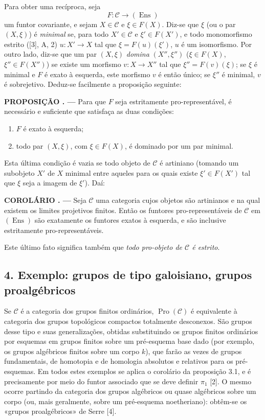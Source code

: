 \documentclass[11pt,twoside,openany]{book}
\numberwithin{equation}{section}
\newcommand{\src}[1]{%
  \phantomsection\hypertarget{src:#1}{}%
  \marginpar{\raggedleft\footnotesize\sffamily #1}%
}
\theoremstyle{plain}
\theoremstyle{definition}
\theoremstyle{remark}
\newcommand{\result}[2]{%
  \par\medskip\noindent\textbf{#1%
  \if\relax\detokenize{#2}\relax\else\space#2\fi. ---}\enspace
}
\newcommand{\FgaUnitKey}{frontmatter}
\renewcommand{\src}[1]{%
  \phantomsection\hypertarget{src:\FgaUnitKey:#1}{}%
  \marginpar{\raggedleft\footnotesize\sffamily #1}%
}
\begin{document}
Para obter uma recíproca, seja
\[
  F:\mathcal C\longrightarrow(\operatorname{Ens})
\]
um funtor covariante, e sejam $X\in\mathcal C$ e $\xi\in F(X)$. Diz-se que
$\xi$ (ou o par \src{374}$(X,\xi)$) é \emph{minimal} se, para todo
$X'\in\mathcal C$ e $\xi'\in F(X')$, e todo monomorfismo estrito ([3], A, 2)
$u:X'\longrightarrow X$ tal que $\xi=F(u)(\xi')$, $u$ é um isomorfismo. Por
outro lado, diz-se que um par $(X,\xi)$ \emph{domina} $(X'',\xi'')$
($\xi\in F(X)$, $\xi''\in F(X'')$) se existe um morfismo
$v:X\longrightarrow X''$ tal que $\xi''=F(v)(\xi)$; se $\xi$ é minimal e $F$
é exato à esquerda, este morfismo $v$ é então único; se $\xi''$ é
minimal, $v$ é sobrejetivo. Deduz-se facilmente a proposição seguinte:

\result{PROPOSIÇÃO}{3.1} Para que $F$ seja estritamente pro-representável, é
necessário e suficiente que satisfaça as duas condições:
\begin{enumerate}
\item[(i)] $F$ é exato à esquerda;
\item[(ii)] todo par $(X,\xi)$, com $\xi\in F(X)$, é dominado por um par
minimal.
\end{enumerate}

Esta última condição é vazia se todo objeto de $\mathcal C$ é artiniano
(tomando um subobjeto $X'$ de $X$ minimal entre aqueles para os quais existe
$\xi'\in F(X')$ tal que $\xi$ seja a imagem de $\xi'$). Daí:

\result{COROLÁRIO}{} Seja $\mathcal C$ uma categoria cujos objetos são
artinianos e na qual existem os limites projetivos finitos. Então os
funtores pro-representáveis de $\mathcal C$ em $(\operatorname{Ens})$ são
exatamente os funtores exatos à esquerda, e são inclusive estritamente
pro-representáveis.

Este último fato significa também que \emph{todo pro-objeto de $\mathcal C$
é estrito}.

\subsection*{4. Exemplo: grupos de tipo galoisiano, grupos proalgébricos}

Se $\mathcal C$ é a categoria dos grupos finitos ordinários,
$\operatorname{Pro}(\mathcal C)$ é equivalente à categoria dos grupos
topológicos compactos totalmente desconexos. São grupos desse tipo e suas
generalizações, obtidas substituindo os grupos finitos ordinários por
esquemas em grupos finitos sobre um pré-esquema base dado (por exemplo, os
grupos algébricos finitos sobre um corpo $k$), que farão as vezes de
grupos fundamentais, de homotopia e de homologia absolutos e relativos para
os pré-esquemas. Em todos estes exemplos se aplica o corolário da
proposição 3.1, e é precisamente por meio do funtor associado que se deve
definir $\pi_1$ [2]. O mesmo ocorre partindo da categoria dos grupos
algébricos ou quase algébricos sobre um corpo (ou, mais geralmente, sobre um
pré-esquema noetheriano): obtêm-se os «grupos proalgébricos» de Serre [4].
\end{document}
